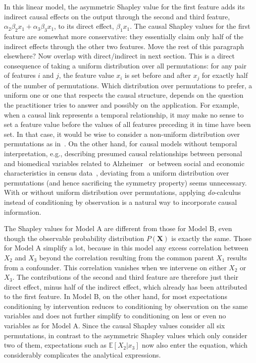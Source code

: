 \documentclass{article}
\newcommand{\vX}{\mathbf{X}}
\newcommand{\expectation}{\mathbb{E}}
\newcommand{\comment}[1]{{\color{red} #1}}
\begin{document}
In this linear model, the asymmetric Shapley value for the first feature adds its indirect causal effects on the output through the second and third feature, $\alpha_2 \beta_2 x_1 + \alpha_3 \beta_3 x_1$, to its direct effect, $\beta_1 x_1$. The causal Shapley values for the first feature are somewhat more conservative: they essentially claim only half of the indirect effects through the other two features. \comment{Move the rest of this paragraph elsewhere? Now overlap with direct/indirect in next section.} This is a direct consequence of taking a uniform distribution over all permutations: for any pair of features $i$ and $j$, the feature value $x_i$ is set before and after $x_j$ for exactly half of the number of permutations. Which distribution over permutations to prefer, a uniform one or one that respects the causal structure, depends on the question the practitioner tries to answer and possibly on the application. For example, when a causal link represents a temporal relationship, it may make no sense to set a feature value before the values of all features preceding it in time have been set. In that case, it would be wise to consider a non-uniform distribution over permutations as in~\cite{frye2019asymmetric}. On the other hand, for causal models without temporal interpretation, e.g., describing presumed causal relationships between personal and biomedical variables related to Alzheimer~\cite{shen2020challenges} or between social and economic characteristics in census data~\cite{chiappa2019path}, deviating from a uniform distribution over permutations (and hence sacrificing the symmetry property) seems unnecessary. With or without uniform distribution over permutations, applying \textit{do}-calculus instead of conditioning by observation is a natural way to incorporate causal information.

The Shapley values for Model A are different from those for Model B, even though the observable probability distribution $P(\vX)$ is exactly the same. Those for Model A simplify a lot, because in this model any excess correlation between $X_2$ and $X_3$ beyond the correlation resulting from the common parent $X_1$ results from a confounder. This correlation vanishes when we intervene on either $X_2$ or $X_3$. The contributions of the second and third feature are therefore just their direct effect, minus half of the indirect effect, which already has been attributed to the first feature. In Model B, on the other hand, for most expectations conditioning by intervention reduces to conditioning by observation on the same variables and does not further simplify to conditioning on less or even no variables as for Model A. Since the causal Shapley values consider all six permutations, in contrast to the asymmetric Shapley values which only consider two of them, expectations such as $\expectation[X_2|x_3]$ now also enter the equation, which considerably complicates the analytical expressions.
\end{document}
